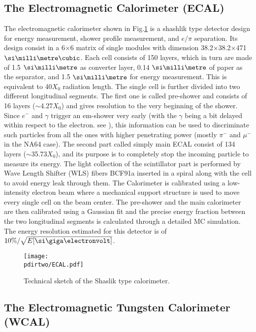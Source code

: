 \subsection{The Electromagnetic Calorimeter (ECAL)}
\label{ch2:sec:detectors-ecal}

The electromagnetic calorimeter shown in Fig.\ref{fig:ecal-sketch} is a shashlik type detector design for energy measurement, shower profile measurement, and $e/\pi$ separation. Its design consist in a 6$\times$6 matrix of single modules with dimension 38.2$\times$38.2$\times$471 $\mmc$. Each cell consists of 150 layers, which in turn are made of 1.5 $\mmi$ as converter layer, 0.14 $\mmi$ of paper as the separator, and 1.5 $\mmi$ for energy measurement. This is equivalent to 40$X_0$ radiation length. The single cell is further divided into two different longitudinal segments. The first one is called pre-shower and consists of 16 layers ($\sim$4.27$X_0$) and gives resolution to the very beginning of the shower. Since $e^-$ and $\gamma$ trigger an em-shower very early (with the $\gamma$ being a bit delayed within respect to the electron. see \cite{Bichsel:2002cf}), this information can be used to discriminate such particles from all the ones with higher penetrating power (mostly $\pi^-$ and $\mu^-$ in the NA64 case). The second part called simply main ECAL consist of 134 layers ($\sim$35.73$X_0$), and its purpose is to completely stop the incoming particle to measure its energy. The light collection of the scintillator part is performed by Wave Length Shifter (WLS) fibers BCF91a \cite{wls-fibers} inserted in a spiral along with the cell to avoid energy leak through them. The Calorimeter is calibrated using a low-intensity electron beam where a mechanical support structure is used to move every single cell on the beam center. The pre-shower and the main calorimeter are then calibrated using a Gaussian fit and the precise energy fraction between the two longitudinal segments is calculated through a detailed MC simulation. The energy resolution estimated for this detector is of $10\% / \sqrt{E[\gev]}$.

\begin{figure}[bth!]
\centering
\texttt{[image: \\pdirtwo/ECAL.pdf]}
\caption[ECAL sketch]{Technical sketch of the Shaslik type calorimeter.}
\label{fig:ecal-sketch}
\end{figure}

\subsection{The Electromagnetic Tungsten Calorimeter (WCAL)}

